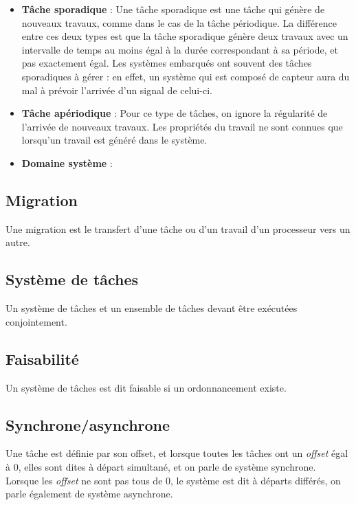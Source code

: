 \begin{itemize}
		\item \textbf{Tâche sporadique} : Une tâche sporadique est une tâche qui génère de nouveaux travaux, 
		comme dans le cas de la tâche périodique. 
		La différence entre ces deux types est que la tâche sporadique 
		génère deux travaux avec un intervalle de temps au moins égal à la durée correspondant à sa période, 
		et pas exactement égal. Les systèmes embarqués ont souvent des tâches sporadiques à gérer : 
		en effet, un système qui est composé de capteur aura du mal à prévoir l'arrivée d'un signal de 
		celui-ci. 
		
		\item \textbf{Tâche apériodique} : Pour ce type de tâches, on ignore la régularité de 
		l'arrivée de nouveaux travaux. Les propriétés du travail ne sont connues que lorsqu'un travail est 
		généré dans le système.
		
		\item \textbf{Domaine système} : 
		
	\end{itemize}
	
	\subsection{Migration}\label{migration}
	Une migration est le transfert d'une tâche ou d'un travail d’un processeur vers un autre. 
	
	\subsection{Système de tâches}
	Un système de tâches et un ensemble de tâches devant être exécutées conjointement. 
	
	\subsection{Faisabilité}
	Un système de tâches est dit faisable si un ordonnancement existe.
	
	\subsection{Synchrone/asynchrone}
	Une tâche est définie par son offset, et lorsque toutes les tâches ont un \textit{offset} égal à 0, 
	elles sont dites \og à départ simultané\fg, et on parle de système synchrone. 
	Lorsque les \textit{offset} ne sont pas tous de 0, le système est dit à départs \og différés\fg{}, 
	on parle également de système asynchrone.
	
